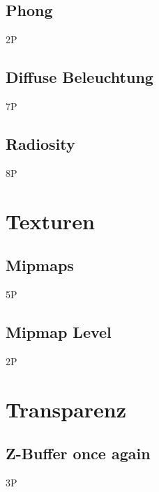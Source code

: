 \documentclass{article}
\def\points#1{\begin{flushright}#1\end{flushright}}
\begin{document}
\subsection{Phong}
 \points{2P}
\subsection{Diffuse Beleuchtung}
 \points{7P}
\subsection{Radiosity}
 \points{8P}

\section{Texturen}
\subsection{Mipmaps}
 \points{5P}
\subsection{Mipmap Level}
 \points{2P}


\section{Transparenz}
\subsection{Z-Buffer once again}
 \points{3P}
\end{document}
